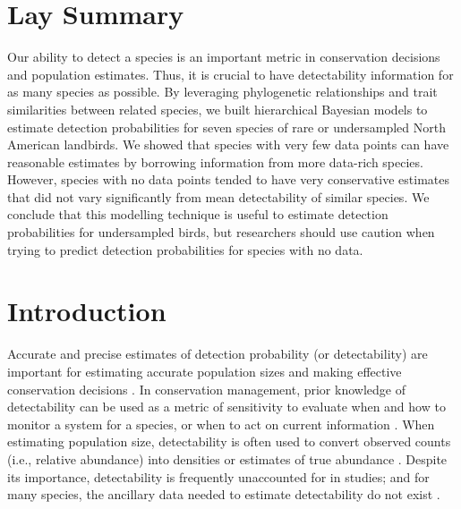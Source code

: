 \documentclass[12pt]{article}
\begin{document}
\section{Lay Summary}
\par Our ability to detect a species is an important metric in conservation decisions and population estimates. 
Thus, it is crucial to have detectability information for as many species as possible.
By leveraging phylogenetic relationships and trait similarities between related species, we built hierarchical Bayesian models to estimate detection probabilities for seven species of rare or undersampled North American landbirds.
We showed that species with very few data points can have reasonable estimates by borrowing information from more data-rich species.
However, species with no data points tended to have very conservative estimates that did not vary significantly from mean detectability of similar species.
We conclude that this modelling technique is useful to estimate detection probabilities for undersampled birds, but researchers should use caution when trying to predict detection probabilities for species with no data.

\section{Introduction}

\par Accurate and precise estimates of detection probability (or detectability) are important for estimating accurate population sizes and making effective conservation decisions \citep{bennett_how_2024}.
In conservation management, prior knowledge of detectability can be used as a metric of sensitivity to evaluate when and how to monitor a system for a species, or when to act on current information \citep{canessa_when_2015, bennett_when_2018}. 
When estimating population size, detectability is often used to convert observed counts (i.e., relative abundance) into densities or estimates of true abundance \citep{solymos_calibrating_2013, johnson_defense_2008}.
Despite its importance, detectability is frequently unaccounted for in studies; and for many species, the ancillary data needed to estimate detectability do not exist \citep{bennett_how_2024}.
\end{document}
